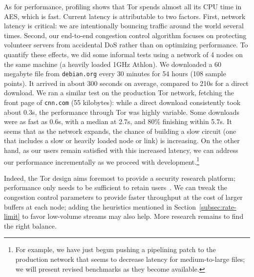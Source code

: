 \documentclass[twocolumn]{article}
\begin{document}
As for performance, profiling shows that Tor spends almost
all its CPU time in AES, which is fast.  Current latency is attributable
to two factors. First, network latency is critical: we are
intentionally bouncing traffic around the world several times. Second,
our end-to-end congestion control algorithm focuses on protecting
volunteer servers from accidental DoS rather than on optimizing
performance. %
To quantify these effects, we did some informal tests using a network of 4
nodes on the same machine (a heavily loaded 1GHz Athlon). We downloaded a 60
megabyte file from {\tt debian.org} every 30 minutes for 54 hours (108 sample
points). It arrived in about 300 seconds on average, compared to 210s for a
direct download. We ran a similar test on the production Tor network,
fetching the front page of {\tt cnn.com} (55 kilobytes): %
while a direct
download consistently took about 0.3s, the performance through Tor was highly
variable. Some downloads were as fast as 0.6s, with a median at 2.7s, and
80\% finishing within 5.7s.  It seems that as the network expands, the chance
of building a slow circuit (one that includes a slow or heavily loaded node
or link) is increasing.  On the other hand, as our users remain satisfied
with this increased latency, we can address our performance incrementally as we
proceed with development.\footnote{For example, we have just begun pushing
a pipelining patch to the production network that seems to decrease
latency for medium-to-large files; we will present revised benchmarks
as they become available.}

Indeed, the Tor
design aims foremost to provide a security research platform; performance
only needs to be sufficient to retain users~\cite{econymics,back01}.
We can tweak the congestion control
parameters to provide faster throughput at the cost of
larger buffers at each node; adding the heuristics mentioned in
Section~\ref{subsec:rate-limit} to favor low-volume
streams may also help. More research remains to find the
right balance.

\end{document}
